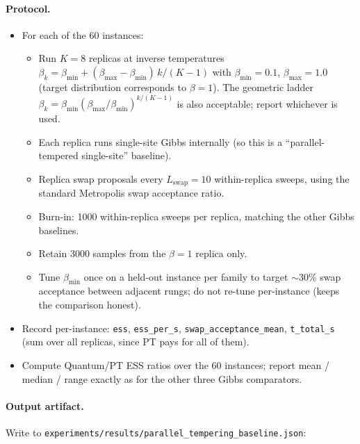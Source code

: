 \paragraph{Protocol.}
\begin{itemize}[leftmargin=*]
  \item For each of the 60 instances:
    \begin{itemize}
      \item Run $K = 8$ replicas at inverse temperatures
            $\beta_k = \beta_{\min} + (\beta_{\max} - \beta_{\min})\,k/(K-1)$
            with $\beta_{\min} = 0.1$, $\beta_{\max} = 1.0$ (target distribution
            corresponds to $\beta = 1$).  The geometric ladder
            $\beta_k = \beta_{\min}(\beta_{\max}/\beta_{\min})^{k/(K-1)}$ is
            also acceptable; report whichever is used.
      \item Each replica runs single-site Gibbs internally (so this is a
            ``parallel-tempered single-site'' baseline).
      \item Replica swap proposals every $L_{\text{swap}} = 10$ within-replica
            sweeps, using the standard Metropolis swap acceptance ratio.
      \item Burn-in: 1000 within-replica sweeps per replica, matching the
            other Gibbs baselines.
      \item Retain 3000 samples from the $\beta = 1$ replica only.
      \item Tune $\beta_{\min}$ once on a held-out instance per family to target
            $\sim$30\% swap acceptance between adjacent rungs; do not re-tune
            per-instance (keeps the comparison honest).
    \end{itemize}
  \item Record per-instance:
        \verb|ess|, \verb|ess_per_s|, \verb|swap_acceptance_mean|,
        \verb|t_total_s| (sum over all replicas, since PT pays for all of them).
  \item Compute Quantum/PT ESS ratios over the 60 instances; report
        mean / median / range exactly as for the other three Gibbs comparators.
\end{itemize}

\paragraph{Output artifact.}  Write to
\verb|experiments/results/parallel_tempering_baseline.json|:

